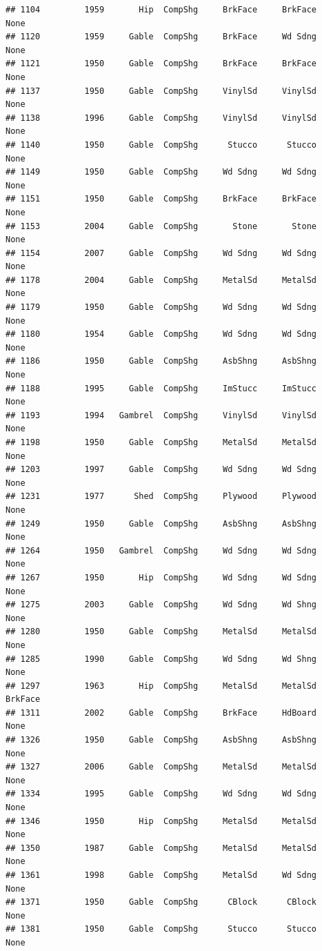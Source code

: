 \documentclass[]{article}
\begin{document}
\begin{verbatim}
## 1104         1959       Hip  CompShg     BrkFace     BrkFace       None
## 1120         1959     Gable  CompShg     BrkFace     Wd Sdng       None
## 1121         1950     Gable  CompShg     BrkFace     BrkFace       None
## 1137         1950     Gable  CompShg     VinylSd     VinylSd       None
## 1138         1996     Gable  CompShg     VinylSd     VinylSd       None
## 1140         1950     Gable  CompShg      Stucco      Stucco       None
## 1149         1950     Gable  CompShg     Wd Sdng     Wd Sdng       None
## 1151         1950     Gable  CompShg     BrkFace     BrkFace       None
## 1153         2004     Gable  CompShg       Stone       Stone       None
## 1154         2007     Gable  CompShg     Wd Sdng     Wd Sdng       None
## 1178         2004     Gable  CompShg     MetalSd     MetalSd       None
## 1179         1950     Gable  CompShg     Wd Sdng     Wd Sdng       None
## 1180         1954     Gable  CompShg     Wd Sdng     Wd Sdng       None
## 1186         1950     Gable  CompShg     AsbShng     AsbShng       None
## 1188         1995     Gable  CompShg     ImStucc     ImStucc       None
## 1193         1994   Gambrel  CompShg     VinylSd     VinylSd       None
## 1198         1950     Gable  CompShg     MetalSd     MetalSd       None
## 1203         1997     Gable  CompShg     Wd Sdng     Wd Sdng       None
## 1231         1977      Shed  CompShg     Plywood     Plywood       None
## 1249         1950     Gable  CompShg     AsbShng     AsbShng       None
## 1264         1950   Gambrel  CompShg     Wd Sdng     Wd Sdng       None
## 1267         1950       Hip  CompShg     Wd Sdng     Wd Sdng       None
## 1275         2003     Gable  CompShg     Wd Sdng     Wd Shng       None
## 1280         1950     Gable  CompShg     MetalSd     MetalSd       None
## 1285         1990     Gable  CompShg     Wd Sdng     Wd Shng       None
## 1297         1963       Hip  CompShg     MetalSd     MetalSd    BrkFace
## 1311         2002     Gable  CompShg     BrkFace     HdBoard       None
## 1326         1950     Gable  CompShg     AsbShng     AsbShng       None
## 1327         2006     Gable  CompShg     MetalSd     MetalSd       None
## 1334         1995     Gable  CompShg     Wd Sdng     Wd Sdng       None
## 1346         1950       Hip  CompShg     MetalSd     MetalSd       None
## 1350         1987     Gable  CompShg     MetalSd     MetalSd       None
## 1361         1998     Gable  CompShg     MetalSd     Wd Sdng       None
## 1371         1950     Gable  CompShg      CBlock      CBlock       None
## 1381         1950     Gable  CompShg      Stucco      Stucco       None

\end{verbatim}
\end{document}

